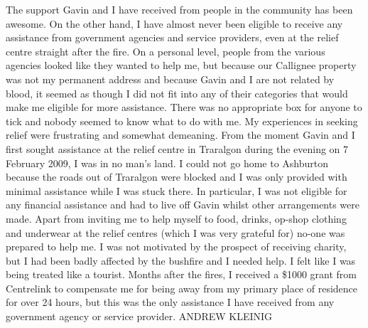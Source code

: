 \documentclass[a4paper]{article}
\begin{document}
        The support Gavin and I have received from people in the community has been awesome. On the other hand, I have almost never been eligible to receive any assistance from government agencies and service providers, even at the relief centre straight after the fire. On a personal level, people from the various agencies looked like they wanted to help me, but because our Callignee property was not my permanent address and because Gavin and I are not related by blood, it seemed as though I did not fit into any of their categories that would make me eligible for more assistance. There was no appropriate box for anyone to tick and nobody seemed to know what to do with me.
        My experiences in seeking relief were frustrating and somewhat demeaning. From the moment Gavin and I first sought assistance at the relief centre in Traralgon during the evening on 7 February 2009, I was in no man's land. I could not go home to Ashburton because the roads out of Traralgon were blocked and I was only provided with minimal assistance while I was stuck there. In particular, I was not eligible for any financial assistance and had to live off Gavin whilst other arrangements were made. Apart from inviting me to help myself to food, drinks, op-shop clothing and underwear at the relief centres (which I was very grateful for) no-one was prepared to help me. I was not motivated by the prospect of receiving charity, but I had been badly affected by the bushfire and I needed help. I felt like I was being treated like a tourist.
        Months after the fires, I received a \$1000 grant from Centrelink to compensate me for being away from my primary place of residence for over 24 hours, but this was the only assistance I have received from any government agency or service provider.
    \newline
    \newline
    ANDREW KLEINIG
\end{document}
